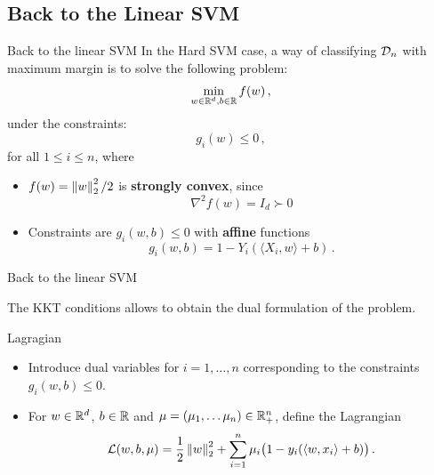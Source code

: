 \documentclass[xcolor={usenames,dvipsnames}]{beamer}
\begin{document}
\subsection{Back to the Linear SVM} 

\begin{frame}{Back to the linear SVM}
In the \alert{Hard SVM case}, a way of classifying ${\mathcal{D}}_n$ with maximum margin is to solve the following problem:
$$
\min_{w \in \mathbb{R}^d, b \in \mathbb{R}}  f(w)\,,
$$
under \alert{the constraints}:
$$ 
g_i(w) \leq 0\,,
$$
for all $1\leq i\leq n$, where
\begin{itemize}
  \item $f(w) = \left\| w \right\|_2^2/2$ is \textbf{strongly convex}, since
  \begin{equation*}
      \nabla^2 f(w) = I_d \succ 0    
  \end{equation*}
  \item Constraints are $g_i(w, b) \leq 0$ with \textbf{affine} functions
  \begin{equation*}
    g_i(w, b) =  1 - Y_i (\langle {X_i, w} \rangle  + b)\,.
  \end{equation*}
\end{itemize}
\end{frame}

\begin{frame}{Back to the linear SVM}




The \alert{KKT conditions} allows to obtain the dual formulation of the problem.

  \bigskip
  \begin{block}{Lagragian}
  \begin{itemize}
    \item Introduce dual variables  for $i=1, \ldots, n$ corresponding to the constraints $g_i(w, b) \leq 0$.
    \item For $w \in \mathbb{R}^d$, $b \in \mathbb{R}$ and $\mu = (\mu_1, \ldots \mu_n) \in \mathbb{R}_+^n$, define the Lagrangian
    \begin{equation*}
      \mathcal{L}(w, b, \mu) = \frac 12 \left\| w \right\|_2^2 + \sum_{i=1}^n \mu_i \big(1 - y_i( \langle {w, x_i} \rangle  + b) \big)\,.
    \end{equation*}
  \end{itemize}
  \end{block}
  
  \end{frame}
\end{document}
